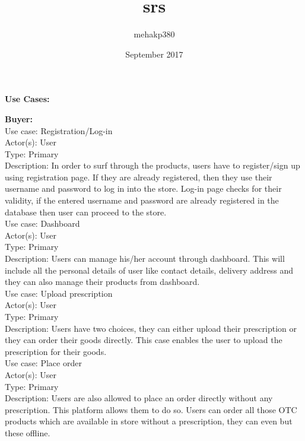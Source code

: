 \documentclass{article}
\title{srs}
\author{mehakp380 }
\date{September 2017}
\begin{document}
\begin{center}
    \large\textbf{{Use Cases:}}
\end{center}
\textbf{Buyer:}
\vspace{0.5cm}
\\Use case:   Registration/Log-in\\
Actor(s):     User              \\                                  
Type:           Primary      \\                                                                                                                       
  Description: In order to surf through the products, users have to register/sign up using registration page. If they are already registered, then they use their username and password to log in into the store. Log-in page checks for their validity, if the entered username and password are already registered in the database then user can proceed to the store.
\vspace{0.5cm}
\\Use case:    Dashboard\\
Actor(s):      User     \\                                               
Type:            Primary       \\                                      
  Description: Users can manage his/her account through dashboard. This will include all the personal details of user like contact details, delivery address and they can also manage their products from dashboard.
\vspace{0.5cm}
\\Use case:    Upload prescription  \\                          
Actor(s):      User   \\                                          
Type:            Primary\\	                                            
Description: Users have two choices, they can either upload their prescription or they can order their goods directly. This case enables the user to upload the prescription for their goods.					
\vspace{0.5cm}
\\Use case:    Place order\\
Actor(s):      User        \\                                          
 Type:            Primary  \\                                          
 Description: Users are also allowed to place an order directly without any prescription. This platform allows them to do so. Users can order all those OTC products which are available in store without a prescription, they can even but these offline.
\end{document}
